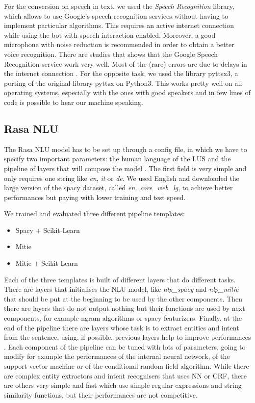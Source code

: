 \documentclass[11pt,a4paper]{article}
\begin{document}
For the conversion on speech in text, we used the \textit{Speech Recognition} library, which allows to use Google's speech recognition services without having to implement particular algorithms. This requires an active internet connection while using the bot with speech interaction enabled. Moreover, a good microphone with noise reduction is recommended in order to obtain a better voice recognition.
There are studies that shows that the Google Speech Recognition service work very well. Most of the (rare) errors are due to delays in the internet connection \cite{speech_study}.
For the opposite task, we used the library pyttsx3, a porting of the original library pyttsx on Python3. This works pretty well on all operating systems, especially with the ones with good speakers and in few lines of code is possible to hear our machine speaking.

\subsection{Rasa NLU}

The Rasa NLU model has to be set up through a config file, in which we have to specify two important parameters: the human language of the LUS and the pipeline of layers that will compose the model \cite{rasa_nlu}. The first field is very simple and only requires one string like \textit{en}, \textit{it} or \textit{de}. We used English and downloaded the large version of the spacy dataset, called \textit{en\_core\_web\_lg}, to achieve better performances but paying with lower training and test speed.

We trained and evaluated three different pipeline templates: 
\begin{itemize}
\item Spacy + Scikit-Learn
\item Mitie
\item Mitie + Scikit-Learn
\end{itemize}

Each of the three templates is built of different layers that do different tasks. There are layers that initialises the NLU model, like \textit{nlp\_spacy} and \textit{nlp\_mitie} that should be put at the beginning to be used by the other components. Then there are layers that do not output nothing but their functions are used by next components, for example ngram algorithms or spacy featurizers. Finally, at the end of the pipeline there are layers whose task is to extract entities and intent from the sentence, using, if possible, previous layers help to improve performances \cite{pipeline}.
Each component of the pipeline can be tuned with lots of parameters, going to modify for example the performances of the internal neural network, of the support vector machine or of the conditional random field algorithm. While there are complex entity extractors and intent recognisers that uses NN or CRF, there are others very simple and fast which use simple regular expressions and string similarity functions, but their performances are not competitive.
\end{document}
